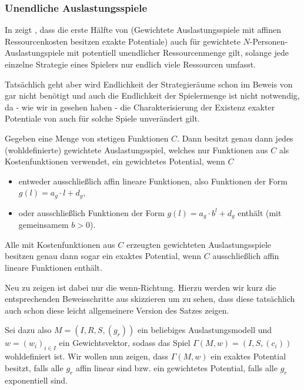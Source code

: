 \subsubsection{Unendliche Auslastungsspiele}


In \cite[Abschnitt 8]{AUniversalCostrGenPotGames} zeigt \citeauthor{AUniversalCostrGenPotGames}, dass die erste Hälfte von  (\glqq Gewichtete Auslastungsspiele mit affinen Ressourcenkosten besitzen exakte Potentiale) auch für gewichtete $N$-Personen-Auslastungspiele mit potentiell unendlicher Ressourcenmenge gilt, solange jede einzelne Strategie eines Spielers nur endlich viele Ressourcen umfasst. 

Tatsächlich geht aber wird Endlichkeit der Strategieräume schon im Beweis von \citeauthor{CharExGewPotinWCG} gar nicht benötigt und auch die Endlichkeit der Spielermenge ist nicht notwendig, da - wie wir in  gesehen haben - die Charakterisierung der Existenz exakter Potentiale von \citeauthor{MonShap} auch für solche Spiele unverändert gilt.

\begin{satz}\label{satz:CharExGewPotinWCG2}
	Gegeben eine Menge von stetigen Funktionen $C$. Dann besitzt genau dann jedes (wohldefinierte) gewichtete Auslastungsspiel, welches nur Funktionen aus $C$ als Kostenfunktionen verwendet, ein gewichtetes Potential, wenn $C$
	\begin{itemize}
		\item entweder ausschließlich affin lineare Funktionen, also Funktionen der Form $g(l) = a_g \cdot l + d_g$,
		\item oder ausschließlich Funktionen der Form $g(l) = a_g\cdot b^l + d_g$ enthält (mit gemeinsamem $b > 0$).
	\end{itemize}
	Alle mit Kostenfunktionen aus $C$ erzeugten gewichteten Auslastungsspiele besitzen genau dann sogar ein exaktes Potential, wenn $C$ ausschließlich affin lineare Funktionen enthält.
\end{satz}

Neu zu zeigen ist dabei nur die \glqq wenn\grqq-Richtung. Hierzu werden wir kurz die entsprechenden Beweisschritte aus \cite[Abschnitt 3]{CharExGewPotinWCG} skizzieren um zu sehen, dass diese tatsächlich auch schon diese leicht allgemeinere Version des Satzes zeigen. 

Sei dazu also $M = (I, R, S, (g_r))$ ein beliebiges Auslastungsmodell und $w = (w_i)_{i \in I}$ ein Gewichtsvektor, sodass das Spiel $\Gamma(M, w) = (I, S, (c_i))$ wohldefiniert ist. Wir wollen nun zeigen, dass $\Gamma(M, w)$ ein exaktes Potential besitzt, falls alle $g_r$ affin linear sind bzw. ein gewichtetes Potential, falls alle $g_r$ exponentiell sind.

